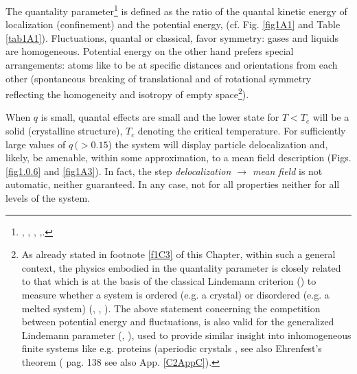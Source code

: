 The quantality parameter\footnote{\cite{Nosanow:76}, \cite{deBoer:57}, \cite{deBoer:48}, \cite{deBoer:48b},\cite{Mottelson:02}.} is defined as the ratio of the quantal kinetic energy of localization (confinement) and the potential energy, (cf. Fig. \ref{fig1A1} and Table \ref{tab1A1}).
 Fluctuations, quantal or classical, favor symmetry: gases and liquids are homogeneous. Potential energy on the other hand prefers special arrangements: atoms like to be at specific distances and orientations from each other (spontaneous breaking of translational and of rotational symmetry reflecting the homogeneity and isotropy of empty space\footnote{As already stated in footnote \ref{f1C3} of this Chapter, within such a  general context, the physics embodied in the quantality parameter is closely related to that which is at the basis of the classical Lindemann criterion (\cite{Lindemann:10}) to measure whether a system is ordered (e.g. a crystal) or disordered (e.g. a melted system) (\cite{Bilgram:87}, \cite{Lowen:94}, \cite{Stillinger:90,Stillinger:95}). The above statement concerning the competition between potential energy and fluctuations,  is also valid for the generalized Lindemann parameter (\cite{Stillinger:90}, \cite{Zhou:99}), used to provide similar insight into inhomogeneous finite systems like e.g. proteins (aperiodic crystals \cite{Schrodinger:44}, see also Ehrenfest's theorem (\cite{Basdevant:05} pag. 138 see also App. \ref{C2AppC}).}).
 
 
  When $q$ is small, quantal effects are small and the lower state for $T<T_c$ will be a solid  (crystalline structure), $T_c$ denoting the critical temperature.  For sufficiently large values of $q\, (>0.15$) the system will display particle delocalization and,  likely, be  amenable, within some approximation, to a mean field description (Figs. \ref{fig1.0.6} and   \ref{fig1A3}). In fact, the step \textit{delocalization $\rightarrow$ mean field} is  not automatic, neither guaranteed. In any case, not for all properties neither for all levels of the system.
  
